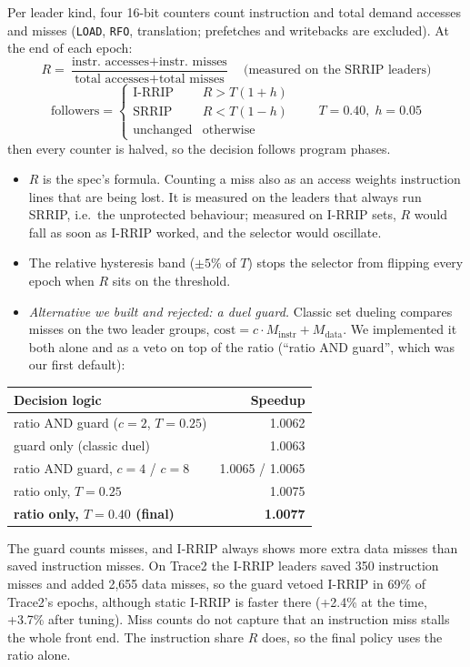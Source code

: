 \documentclass[12pt]{report}
\newcommand{\cfg}[1]{\texttt{#1}}
\begin{document}
Per leader kind, four 16-bit counters count instruction and total demand
accesses and misses (\cfg{LOAD}, \cfg{RFO}, translation; prefetches and
writebacks are excluded). At the end of each epoch:
\[
R=\frac{\text{instr.\ accesses}+\text{instr.\ misses}}{\text{total accesses}+\text{total misses}}
\quad\text{(measured on the SRRIP leaders)}
\]
\[
\text{followers} = \begin{cases}
\text{I-RRIP} & R > T(1+h)\\
\text{SRRIP}  & R < T(1-h)\\
\text{unchanged} & \text{otherwise}
\end{cases}
\qquad T=0.40,\; h=0.05
\]
then every counter is halved, so the decision follows program phases.

\begin{itemize}
\item $R$ is the spec's formula. Counting a miss also as an access weights
  instruction lines that are being lost. It is measured on the leaders that
  always run SRRIP, i.e.\ the unprotected behaviour; measured on I-RRIP sets,
  $R$ would fall as soon as I-RRIP worked, and the selector would oscillate.
\item The relative hysteresis band ($\pm5\%$ of $T$) stops the selector from
  flipping every epoch when $R$ sits on the threshold.
\item \emph{Alternative we built and rejected: a duel guard.} Classic set
  dueling compares misses on the two leader groups,
  $\text{cost}=c\cdot M_{\text{instr}}+M_{\text{data}}$. We implemented it
  both alone and as a veto on top of the ratio (``ratio AND guard'', which
  was our first default):
\end{itemize}

\begin{table}[H]\centering
\begin{tabular}{l r}
\toprule
Decision logic & Speedup\\
\midrule
ratio AND guard ($c=2$, $T=0.25$) & 1.0062\\
guard only (classic duel) & 1.0063\\
ratio AND guard, $c=4$ / $c=8$ & 1.0065 / 1.0065\\
ratio only, $T=0.25$ & 1.0075\\
\textbf{ratio only, $T=0.40$ (final)} & \textbf{1.0077}\\
\bottomrule
\end{tabular}
\end{table}
The guard counts misses, and I-RRIP always shows more extra data misses than
saved instruction misses. On Trace2 the I-RRIP leaders saved 350 instruction
misses and added 2,655 data misses, so the guard vetoed I-RRIP in 69\% of
Trace2's epochs, although static I-RRIP is faster there (+2.4\% at the time, +3.7\% after tuning). Miss counts do
not capture that an instruction miss stalls the whole front end. The
instruction share $R$ does, so the final policy uses the ratio alone.
\end{document}

